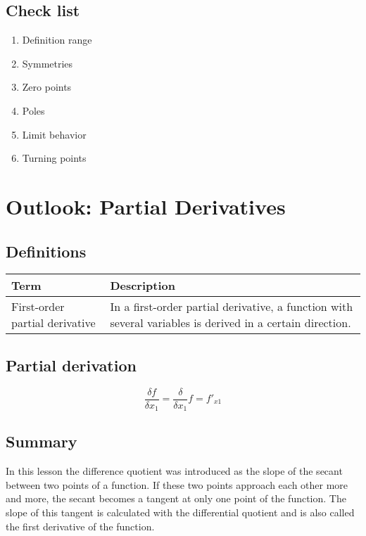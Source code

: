 \documentclass{book}
\begin{document}
\subsection{Check list}
\begin{enumerate}
  \item{Definition range}
  \item{Symmetries}
  \item{Zero points}
  \item{Poles}
  \item{Limit behavior}
  \item{Turning points}
\end{enumerate}

\section{Outlook: Partial Derivatives}

\subsection{Definitions}

\begin{tabular}{p{3cm}p{10.5cm}}
  \toprule
  \textbf{Term} & \textbf{Description} \\
  \midrule
  First-order partial derivative & In a first-order partial derivative, a function with several variables is derived in a certain direction.\\
  \bottomrule
\end{tabular}

\subsection{Partial derivation}

\[
  \frac{\delta f}{\delta x_1} = \frac{\delta}{\delta x_1}f = f'_{x1}
\]

\subsection{Summary}

In this lesson the difference quotient was introduced as the slope of the secant between two points of a function. If these two points approach each other more and more, the secant becomes a tangent at only one point of the function. The slope of this tangent is calculated with the differential quotient and is also called the first derivative of the function.
\end{document}
